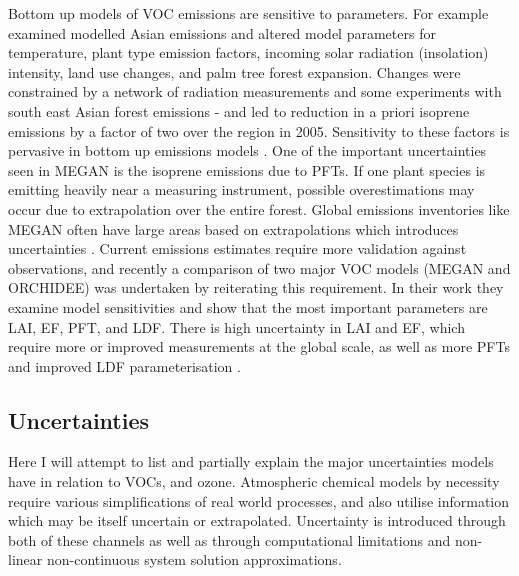     Bottom up models of VOC emissions are sensitive to parameters.
    For example \textcite{Stavrakou2014} examined modelled Asian emissions and altered model parameters for temperature, plant type emission factors, incoming solar radiation (insolation) intensity, land use changes, and palm tree forest expansion.
    Changes were constrained by a network of radiation measurements and some experiments with south east Asian forest emissions - and led to reduction in a priori isoprene emissions by a factor of two over the region in 2005.
    Sensitivity to these factors is pervasive in bottom up emissions models \parencite[eg.][]{Marais2014,Miller2014,Messina2016}.
    One of the important uncertainties seen in MEGAN is the isoprene emissions due to PFTs.
    If one plant species is emitting heavily near a measuring instrument, possible overestimations may occur due to extrapolation over the entire forest.
    Global emissions inventories like MEGAN often have large areas based on extrapolations which introduces uncertainties \parencite{Miller2014}.
    Current emissions estimates require more validation against observations, and recently a comparison of two major VOC models (MEGAN and ORCHIDEE) was undertaken by \textcite{Messina2016} reiterating this requirement.
    In their work they examine model sensitivities and show that the most important parameters are LAI, EF, PFT, and LDF.
    There is high uncertainty in LAI and EF, which require more or improved measurements at the global scale, as well as more PFTs and improved LDF parameterisation \parencite{Messina2016}.
    
  
  \subsection{Uncertainties}
  \label{LR:Models:Uncert}
    
    Here I will attempt to list and partially explain the major uncertainties models have in relation to  VOCs, and ozone.
    Atmospheric chemical models by necessity require various simplifications of real world processes, and also utilise information which may be itself uncertain or extrapolated.
    Uncertainty is introduced through both of these channels as well as through computational limitations and non-linear non-continuous system solution approximations.
    
    
